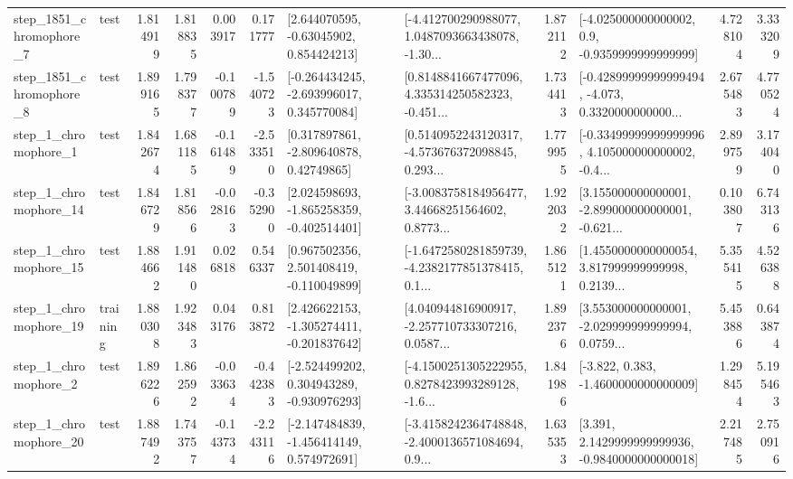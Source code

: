 \begin{tabular}{llrrrrllrlrr}
  step\_1851\_chromophore\_7 &      test &      1.814919 &    1.818835 &      0.003917 &  0.171777 &     [2.644070595, -0.63045902, 0.854424213] &  [-4.412700290988077, 1.0487093663438078, -1.30... &       1.872112 &     [-4.025000000000002, 0.9, -0.9359999999999999] &            4.728104 &          3.333209 \\
  step\_1851\_chromophore\_8 &      test &      1.899165 &    1.798377 &     -0.100789 & -1.540723 &   [-0.264434245, -2.693996017, 0.345770084] &  [0.8148841667477096, 4.335314250582323, -0.451... &       1.734413 &  [-0.42899999999999494, -4.073, 0.3320000000000... &            2.675483 &          4.770524 \\
     step\_1\_chromophore\_1 &      test &      1.842674 &    1.681185 &     -0.161489 & -2.533510 &     [0.317897861, -2.809640878, 0.42749865] &  [0.5140952243120317, -4.573676372098845, 0.293... &       1.779955 &  [-0.33499999999999996, 4.105000000000002, -0.4... &            2.899759 &          3.174040 \\
    step\_1\_chromophore\_14 &      test &      1.846729 &    1.818566 &     -0.028163 & -0.352900 &   [2.024598693, -1.865258359, -0.402514401] &  [-3.0083758184956477, 3.44668251564602, 0.8773... &       1.922032 &  [3.155000000000001, -2.899000000000001, -0.621... &            0.103807 &          6.743136 \\
    step\_1\_chromophore\_15 &      test &      1.884662 &    1.911480 &      0.026818 &  0.546337 &    [0.967502356, 2.501408419, -0.110049899] &  [-1.6472580281859739, -4.2382177851378415, 0.1... &       1.865121 &  [1.4550000000000054, 3.817999999999998, 0.2139... &            5.355415 &          4.526388 \\
    step\_1\_chromophore\_19 &  training &      1.880308 &    1.923483 &      0.043176 &  0.813872 &   [2.426622153, -1.305274411, -0.201837642] &  [4.040944816900917, -2.257710733307216, 0.0587... &       1.892376 &  [3.553000000000001, -2.029999999999994, 0.0759... &            5.453886 &          0.643874 \\
     step\_1\_chromophore\_2 &      test &      1.896226 &    1.862592 &     -0.033634 & -0.442383 &   [-2.524499202, 0.304943289, -0.930976293] &  [-4.1500251305222955, 0.8278423993289128, -1.6... &       1.841986 &               [-3.822, 0.383, -1.4600000000000009] &            1.298454 &          5.195463 \\
    step\_1\_chromophore\_20 &      test &      1.887492 &    1.743757 &     -0.143734 & -2.243116 &   [-2.147484839, -1.456414149, 0.574972691] &  [-3.4158242364748848, -2.4000136571084694, 0.9... &       1.635353 &   [3.391, 2.1429999999999936, -0.9840000000000018] &            2.217485 &          2.750916 \\

\end{tabular}
